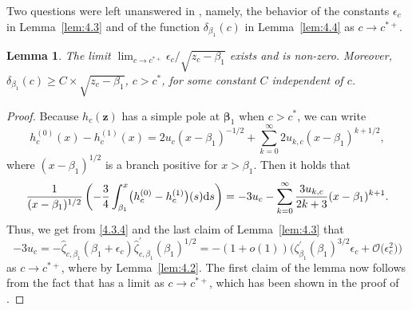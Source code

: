 \documentclass[10pt,a4paper]{amsart}
\numberwithin{equation}{section}
\newtheorem{Lemma}[Theorem]{Lemma}
\newcommand{\z}	{{\boldsymbol z}}
\begin{document}
Two questions were left unanswered in \cite[Section~7.4]{ApDenYa21}, namely, the behavior of the constants $ \epsilon_c $ in Lemma~\ref{lem:4.3} and of the function $ \delta_{\beta_1}(c) $ in Lemma~\ref{lem:4.4} as $ c\to c^{*+} $.

\begin{Lemma}
\label{lem:4.5}
The limit $ \lim_{c\to c^{*+}}\epsilon_c/\sqrt{z_c-\beta_1} $ exists and is non-zero. Moreover, $ \delta_{\beta_1}(c) \geq C\allowbreak\times\sqrt{z_c-\beta_1} $, $ c>c^* $, for some constant $ C $ independent of $ c $.
\end{Lemma}
\begin{proof}
Because $ h_c(\z) $ has a simple pole at $ \boldsymbol\beta_1 $ when $ c>c^* $, we can write
\[
h_c^{(0)}(x) - h_c^{(1)}(x) = 2u_c (x - \beta_1)^{-1/2} + \sum_{k=0}^\infty 2u_{k,c}(x - \beta_1)^{k+1/2},
\]
where $ (x-\beta_1)^{1/2} $ is a branch positive for $ x>\beta_1 $. Then it holds that
\[
\frac1{(x-\beta_1)^{1/2}} \left( -\frac34\int_{\beta_1}^x \bigl(h_c^{(0)}-h_c^{(1)}\bigr)(s) {\rm d}s \right) = -3u_c - \sum_{k=0}^\infty \frac{3u_{k,c}}{2k+3} (x-\beta_1)^{k+1}.
\]
Thus, we get from \eqref{4.3.4} and the last claim of Lemma~\ref{lem:4.3} that
\[
-3u_c = -\hat\zeta_{c,\beta_1}(\beta_1+\epsilon_c)\hat\zeta_{c,\beta_1}^\prime(\beta_1)^{1/2} = -(1+o(1)) \bigl(\zeta_{\beta_1}^\prime(\beta_1)^{3/2}\epsilon_c + \mathcal O\bigl(\epsilon_c^2\bigr) \bigr)
\]
as $ c\to c^{*+} $, where  by Lemma~\ref{lem:4.2}. The first claim of the lemma now follows from the fact that  has a limit as $ c\to c^{*+} $, which has been shown in the proof of \cite[Lemma~7.7]{ApDenYa21}.


\end{proof}
\end{document}
